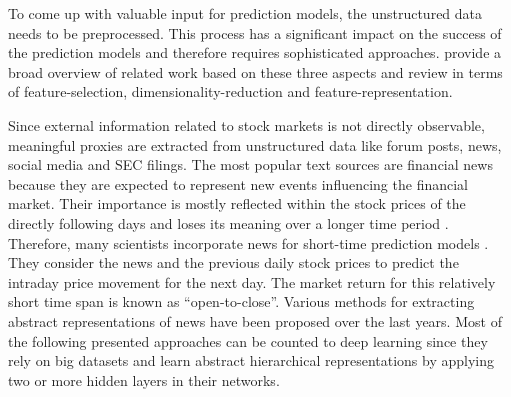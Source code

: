 To come up with valuable input for prediction models, the unstructured data needs to be preprocessed. This process has a significant impact on the success of the prediction models and therefore requires sophisticated approaches. \citet{KhadjehNassirtoussi2014TextReview} provide a broad overview of related work based on these three aspects and review in terms of feature-selection, dimensionality-reduction and feature-representation.




Since external information related to stock markets is not directly observable, meaningful proxies are extracted from unstructured data like forum posts, news, social media and SEC filings. The most popular text sources are financial news \cite{Peng2016LeverageNetworks, KhadjehNassirtoussi2015TextSentiment, Zhai2007CombiningPrediction} because they are expected to represent new events influencing the financial market. Their importance is mostly reflected within the stock prices of the directly following days and loses its meaning over a longer time period \cite{Ding2014UsingInvestigation}. Therefore, many scientists incorporate news for short-time prediction models \cite{KhadjehNassirtoussi2014TextReview}. They consider the news and the previous daily stock prices to predict the intraday price movement for the next day. The market return for this relatively short time span is known as \enquote{open-to-close}. Various methods for extracting abstract representations of news have been proposed over the last years. Most of the following presented approaches can be counted to deep learning since they rely on big datasets and learn abstract hierarchical representations by applying two or more hidden layers in their networks.

